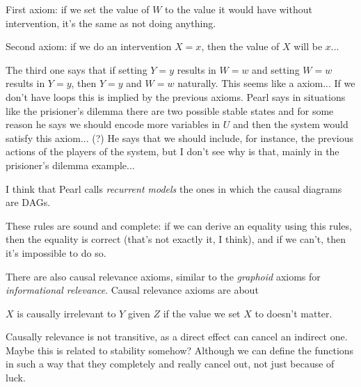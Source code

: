 First axiom: if we set the value of $W$ to the value it would have without intervention, it's the same as not doing anything.

Second axiom: if we do an intervention $X=x$, then the value of $X$ will be $x$...

The third one says that if setting $Y=y$ results in $W=w$ and setting $W=w$ results in $Y=y$, then $Y=y$ and $W=w$ naturally. This seems like a  axiom... If we don't have loops this is implied by the previous axioms. Pearl says in situations like the prisioner's dilemma there are two possible stable states and for some reason he says we should encode more variables in $U$ and then the system would satisfy this axiom... (?) He says that we should include, for instance, the previous actions of the players of the system, but I don't see why is that, mainly in the prisioner's dilemma example...

I think that Pearl calls \textit{recurrent models} the ones in which the causal diagrams are DAGs.

These rules are sound and complete: if we can derive an equality using this rules, then the equality is correct (that's not exactly it, I think), and if we can't, then it's impossible to do so.

There are also causal relevance axioms, similar to the \textit{graphoid} axioms for \textit{informational relevance}. Causal relevance axioms are about 

$X$ is causally irrelevant to $Y$ given $Z$ if the value we set $X$ to doesn't matter.

Causally relevance is not transitive, as a direct effect can cancel an indirect one. Maybe this is related to stability somehow? Although we can define the functions in such a way that they completely and really cancel out, not just because of luck.


